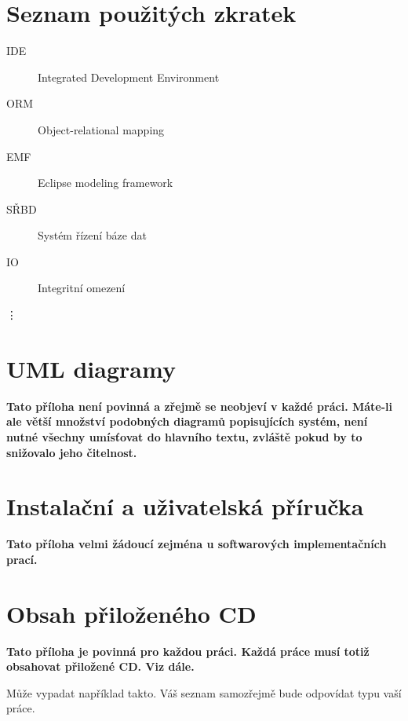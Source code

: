 \documentclass[11pt,twoside,a4paper]{book}
\begin{document}
\chapter{Seznam použitých zkratek}

\begin{description}
\item[IDE] Integrated Development Environment
\item[ORM] Object-relational mapping
\item[EMF] Eclipse modeling framework
\item[SŘBD] Systém řízení báze dat
\item[IO] Integritní omezení
\end{description}
\vdots

\chapter{UML diagramy}
\textbf{\large Tato příloha není povinná a zřejmě se neobjeví v každé práci. Máte-li ale větší množství podobných diagramů popisujících systém, není nutné všechny umísťovat do hlavního textu, zvláště pokud by to snižovalo jeho čitelnost.}

\chapter{Instalační a uživatelská příručka}
\textbf{\large Tato příloha velmi žádoucí zejména u softwarových implementačních prací.}

\chapter{Obsah přiloženého CD}
\textbf{\large Tato příloha je povinná pro každou práci. Každá práce musí totiž obsahovat přiložené CD. Viz dále.}

Může vypadat například takto. Váš seznam samozřejmě bude odpovídat typu vaší práce. 
\end{document}
